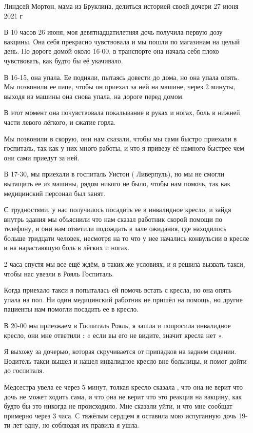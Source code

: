 Линдсей Мортон, мама из Бруклина, делиться историей своей дочери 27 июня 2021 г

В 10 часов 26 июня, моя девятнадцатилетняя дочь получила первую дозу
вакцины. Она себя прекрасно чувствовала и мы пошли по магазинам на целый
день. По дороге домой около 16-00, в транспорте она начала себя плохо
чувствовать, как будто бы её укачивало.

В 16-15, она упала. Ее подняли, пытаясь довести до дома, но она упала опять. Мы
позвонили ее папе, чтобы он приехал за ней на машине, через 2 минуты, выходя из
машины она снова упала, на дороге перед домом.

В этот момент она почувствовала покалывание в руках и ногах, боль в нижней части
левого лёгкого, и сжатие горла.

Мы позвонили в скорую, они нам сказали, чтобы мы сами быстро приехали в
госпиталь, так как у них много работы, и что я привезу её намного быстрее чем
они сами приедут за ней.

В 17-30, мы приехали в госпиталь Уистон ( Ливерпуль), но мы не смогли вытащить
ее из машины, рядом никого не было, чтобы нам помочь, так как медицинский
персонал был занят.

С трудностями, у нас получилось посадить ее в инвалидное кресло, и зайдя внутрь
здания мы объяснили что нам сказал работник скорой помощи по телефону, и они нам
ответили подождать в зале ожидания, где находилось больше тридцати человек,
несмотря на то что у нее начались конвульсии в кресле и на нарастающую боль в
лёгких и ногах.

2 часа спустя мы все ещё ждём, в таких же условиях, и я решила вызвать такси,
чтобы нас увезли в Рояль Госпиталь.

Когда приехало такси я попыталась ей помочь встать с кресла, но она опять упала
на пол. Ни один медицинский работник не пришёл на помощь, но другие пациенты нам
помогли посадить ее в кресло.

В 20-00 мы приезжаем в Госпиталь Рояль, я зашла и попросила инвалидное кресло,
они мне ответили : « если вы его не видите, значит кресла нет ».

Я выхожу за дочерью, которая скручивается от припадков на заднем
сидении. Водитель такси вышел и нашел инвалидное кресло вне больницы, и помог
дойти до госпиталя.

Медсестра увела ее через 5 минут, толкая кресло сказала , что она не верит что
дочь не может ходить сама, и что она не верит что это реакция на вакцину, как
будто бы это никогда не происходило. Мне сказали уйти, и что мне сообщат
примерно через 3 часа. С тяжёлым сердцем я оставила мою испуганную дочь 19-ти
лет одну, но соблюдая их правила я ушла.

